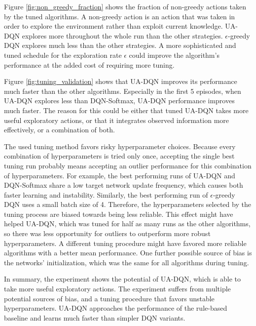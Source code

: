 Figure \ref{fig:non_greedy_fraction} shows the fraction of non-greedy actions taken by the tuned algorithms.
A non-greedy action is an action that was taken in order to explore the environment rather than exploit current knowledge.
UA-DQN explores more throughout the whole run than the other strategies.
$\epsilon$-greedy DQN explores much less than the other strategies.
A more sophisticated and tuned schedule for the exploration rate $\epsilon$ could improve the algorithm's performance at the added cost of requiring more tuning.

Figure \ref{fig:tuning_validation} shows that UA-DQN improves its performance much faster than the other algorithms.
Especially in the first 5 episodes, when UA-DQN explores less than DQN-Softmax, UA-DQN performance improves much faster.
The reason for this could be either that tuned UA-DQN takes more useful exploratory actions, or that it integrates observed information more effectively, or a combination of both.

The used tuning method favors risky hyperparameter choices.
Because every combination of hyperparameters is tried only once, accepting the single best tuning run probably means accepting an outlier performance for this combination of hyperparameters.
For example, the best performing runs of UA-DQN and DQN-Softmax share a low target network update frequency, which causes both faster learning and instability. Similarly, the best performing run of $\epsilon$-greedy DQN uses a small batch size of 4.
Therefore, the hyperparameters selected by the tuning process are biased towards being less reliable.
This effect might have helped UA-DQN, which was tuned for half as many runs as the other algorithms, so there was less opportunity for outliers to outperform more robust hyperparameters.
A different tuning procedure might have favored more reliable algorithms with a better mean performance.
One further possible source of bias is the networks' initialization, which was the same for all algorithms during tuning.

In summary, the experiment shows the potential of UA-DQN, which is able to take more useful exploratory actions.
The experiment suffers from multiple potential sources of bias, and a tuning procedure that favors unstable hyperparameters.
UA-DQN approaches the performance of the rule-based baseline and learns much faster than simpler DQN variants.


